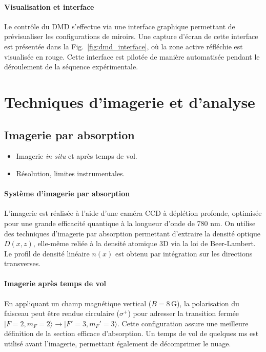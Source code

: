 \paragraph{Visualisation et interface}

Le contrôle du DMD s’effectue via une interface graphique permettant de prévisualiser les configurations de miroirs. Une capture d’écran de cette interface est présentée dans la Fig.~\ref{fig:dmd_interface}, où la zone active réfléchie est visualisée en rouge. Cette interface est pilotée de manière automatisée pendant le déroulement de la séquence expérimentale.


\section{Techniques d’imagerie et d’analyse}
\subsection{Imagerie par absorption}
{\color{blue}
\begin{itemize}
    \item Imagerie \textit{in situ} et après temps de vol.
    \item Résolution, limites instrumentales.
\end{itemize}
}

\paragraph{Système d’imagerie par absorption}

L’imagerie est réalisée à l’aide d’une caméra CCD à déplétion profonde, optimisée pour une grande efficacité quantique à la longueur d’onde de 780 nm. On utilise des techniques d’imagerie par absorption permettant d’extraire la densité optique \( D(x, z) \), elle-même reliée à la densité atomique 3D via la loi de Beer-Lambert. Le profil de densité linéaire \( n(x) \) est obtenu par intégration sur les directions transverses.

\paragraph{Imagerie après temps de vol}

En appliquant un champ magnétique vertical (\( B = 8\,\mathrm{G} \)), la polarisation du faisceau peut être rendue circulaire (\( \sigma^+ \)) pour adresser la transition fermée \( |F=2, m_F=2\rangle \rightarrow |F'=3, m_F'=3\rangle \). Cette configuration assure une meilleure définition de la section efficace d’absorption. Un temps de vol de quelques ms est utilisé avant l’imagerie, permettant également de décomprimer le nuage.

